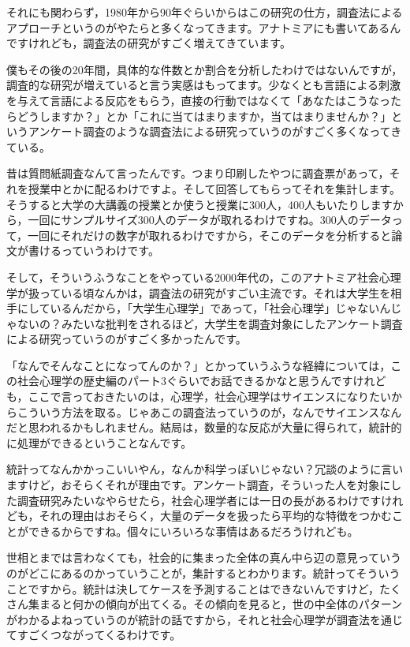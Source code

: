 \documentclass{ltjsbook}
\begin{document}
それにも関わらず，1980年から90年ぐらいからはこの研究の仕方，調査法によるアプローチというのがやたらと多くなってきます。アナトミアにも書いてあるんですけれども，調査法の研究がすごく増えてきています。

僕もその後の20年間，具体的な件数とか割合を分析したわけではないんですが，調査的な研究が増えていると言う実感はもってます。少なくとも言語による刺激を与えて言語による反応をもらう，直接の行動ではなくて「あなたはこうなったらどうしますか？」とか「これに当てはまりますか，当てはまりませんか？」というアンケート調査のような調査法による研究っていうのがすごく多くなってきている。

昔は質問紙調査なんて言ったんです。つまり印刷したやつに調査票があって，それを授業中とかに配るわけですよ。そして回答してもらってそれを集計します。そうすると大学の大講義の授業とか使うと授業に300人，400人もいたりしますから，一回にサンプルサイズ300人のデータが取れるわけですね。300人のデータって，一回にそれだけの数字が取れるわけですから，そこのデータを分析すると論文が書けるっていうわけです。

そして，そういうふうなことをやっている2000年代の，このアナトミア社会心理学が扱っている頃なんかは，調査法の研究がすごい主流です。それは大学生を相手にしているんだから，「大学生心理学」であって，「社会心理学」じゃないんじゃないの？みたいな批判をされるほど，大学生を調査対象にしたアンケート調査による研究っていうのがすごく多かったんです。

「なんでそんなことになってんのか？」とかっていうふうな経緯については，この社会心理学の歴史編のパート3ぐらいでお話できるかなと思うんですけれども，ここで言っておきたいのは，心理学，社会心理学はサイエンスになりたいからこういう方法を取る。じゃあこの調査法っていうのが，なんでサイエンスなんだと思われるかもしれません。結局は，数量的な反応が大量に得られて，統計的に処理ができるということなんです。

統計ってなんかかっこいいやん，なんか科学っぽいじゃない？冗談のように言いますけど，おそらくそれが理由です。アンケート調査，そういった人を対象にした調査研究みたいなやらせたら，社会心理学者には一日の長があるわけですけれども，それの理由はおそらく，大量のデータを扱ったら平均的な特徴をつかむことができるからですね。個々にいろいろな事情はあるだろうけれども。

世相とまでは言わなくても，社会的に集まった全体の真ん中ら辺の意見っていうのがどこにあるのかっていうことが，集計するとわかります。統計ってそういうことですから。統計は決してケースを予測することはできないんですけど，たくさん集まると何かの傾向が出てくる。その傾向を見ると，世の中全体のパターンがわかるよねっていうのが統計の話ですから，それと社会心理学が調査法を通じてすごくつながってくるわけです。
\end{document}
